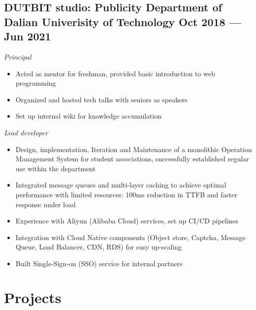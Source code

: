 \documentclass[a4,12pt]{article}
\newcommand{\subtext}[1]{
#1\par\vspace{-0.3cm}}
\newenvironment{zitemize}{
\begin{itemize}\itemsep0pt \parskip0pt \parsep1pt}
{\end{itemize}\vspace{-0.5cm}}
\begin{document}
\subsection*{DUTBIT studio: {\normalsize\normalfont Publicity Department of Dalian Univerisity of Technology} \hfill  Oct 2018 --- Jun 2021} 

\subtext{\textit{Principal}}
\begin{zitemize}
    \item Acted as mentor for freshman, provided basic introduction to web programming
    \item Organized and hosted tech talks with seniors as speakers
    \item Set up internal wiki for knowledge accumulation
\end{zitemize}

\vspace{0.3cm}
\subtext{\textit{Lead developer}}
    \begin{zitemize}
        \item Design, implementation, Iteration and Maintenance of a monolithic Operation Management System for student associations, successfully established regular use within the department
        \item Integrated message queues and multi-layer caching to achieve optimal performance with limited resources: 100ms reduction in TTFB and faster response under load
        \item Experience with Aliyun (Alibaba Cloud) services, set up CI/CD pipelines
        \item Integration with Cloud Native components (Object store, Captcha, Message Queue, Load Balancer, CDN, RDS) for easy up-scaling
        \item Built Single-Sign-on (SSO) service for internal partners 
    \end{zitemize}

\section{\textbf{Projects}}

\end{document}
